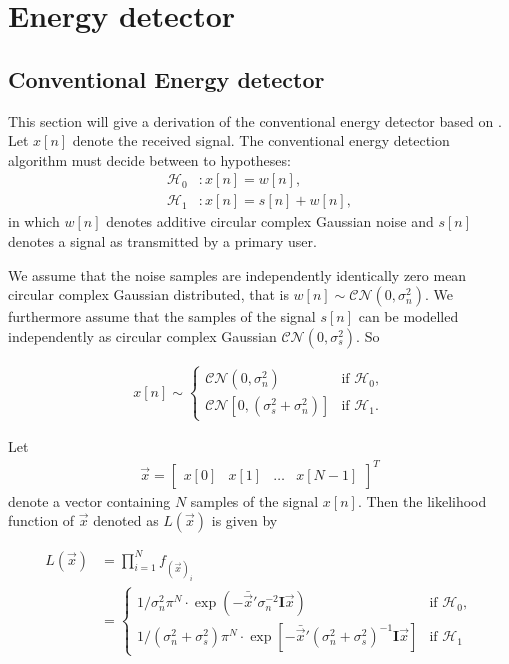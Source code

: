 \documentclass[a4paper, openany, oneside]{memoir}
\begin{document}
\section{Energy detector}

\subsection{Conventional Energy detector}\label{ssec:conv_ed_derivation}
This section will give a derivation of the conventional energy detector based on \cite{atapattu2014energy}.
Let $x[n]$ denote the received signal. The conventional energy detection algorithm must decide between to hypotheses:
\begin{align}\label{eq:hypotheses}
  \mathcal{H}_0&: x[n] = w[n],\\
  \mathcal{H}_1&: x[n] = s[n] + w[n],
\end{align}
in which $w[n]$ denotes additive circular complex Gaussian noise and $s[n]$ denotes a signal as transmitted by a primary user.

We assume that the noise samples are independently identically zero mean circular complex Gaussian distributed, that is $w[n] \sim \mathcal{CN}(0, \sigma_n^2)$. 
We furthermore assume that the samples of the signal $s[n]$ can be modelled independently as circular complex Gaussian $\mathcal{CN}(0, \sigma_s^2)$. %
So

\begin{align*}
x[n] \sim 
    \begin{cases}
        \mathcal{CN}(0, \sigma_n^2) & \text{if $\mathcal{H}_0$}, \\
        \mathcal{CN}[0, (\sigma_s^2 + \sigma_n^2)] & \text{if $\mathcal{H}_1$}.
    \end{cases}
\end{align*} 

Let
\begin{align*}
    \vec{x} = \begin{bmatrix}x[0] & x[1]& \ldots& x[N-1]\end{bmatrix}^T
\end{align*}
denote a vector containing $N$ samples of the signal $x[n]$. Then the likelihood function of $\vec{x}$ denoted as $L(\vec{x})$ is given by

\begin{align*}
    L(\vec{x}) &= \prod_{i=1}^N f_{(\vec{x})_i}\\
    &= \begin{cases}
        1/\sigma_n^2 \pi^N \cdot \exp(-\bar{\vec{x}}'\sigma_n^{-2}\mathbf{I}\vec{x}) & \text{if $\mathcal{H}_0$}, \\
        1/(\sigma_n^2 + \sigma_s^2) \pi^N \cdot \exp[-\bar{\vec{x}}'(\sigma_n^2+\sigma_s^2)^{-1}\mathbf{I}\vec{x}] & \text{if $\mathcal{H}_1$}
    \end{cases}
\end{align*}
\end{document}

